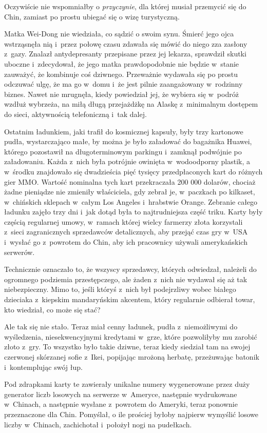 \documentclass[oneside,polish,11pt,rmheadings]{mwbk}
\begin{document}
Oczywiście nie wspomniałby o \textit{przyczynie}, dla której musiał przemycić się do Chin, zamiast po prostu ubiegać się o wizę turystyczną.

Matka Wei-Dong nie wiedziała, co sądzić o swoim synu. Śmierć jego ojca wstrząsnęła nią i~przez połowę czasu zdawała się mówić do niego zza zasłony z~gazy. Znalazł antydepresanty przepisane przez jej lekarza, sprawdził skutki uboczne i~zdecydował, że jego matka prawdopodobnie nie będzie w~stanie zauważyć, że kombinuje coś dziwnego. Przeważnie wydawała się po prostu odczuwać ulgę, że ma go w~domu i~że jest pilnie zaangażowany w~rodzinny biznes. Nawet nie mrugnęła, kiedy powiedział jej, że wybiera się w~podróż wzdłuż wybrzeża, na miłą długą przejażdżkę na Alaskę z~minimalnym dostępem do sieci, aktywnością telefoniczną i~tak dalej.

Ostatnim ładunkiem, jaki trafił do kosmicznej kapsuły, były trzy kartonowe pudła, wystarczająco małe, by można je było załadować do bagażnika Huawei, którego pozostawił na długoterminowym parkingu i~zamknął podwójnie po załadowaniu. Każda z~nich była potrójnie owinięta w~wodoodporny plastik, a w~środku znajdowało się dwadzieścia pięć tysięcy przedpłaconych kart do różnych gier MMO. Wartość nominalna tych kart przekraczała 200 000 dolarów, chociaż żadne pieniądze nie zmieniły właściciela, gdy zebrał je, w~paczkach po kilkaset, w~chińskich sklepach w~całym Los Angeles i~hrabstwie Orange. Zebranie całego ładunku zajęło trzy dni i~jak dotąd była to najtrudniejsza część triku. Karty były częścią regularnej umowy, w~ramach której wielcy farmerzy złota korzystali z~sieci zagranicznych sprzedawców detalicznych, aby przejąć czas gry w~USA i~wysłać go z~powrotem do Chin, aby ich pracownicy używali amerykańskich serwerów.

Technicznie oznaczało to, że wszyscy sprzedawcy, których odwiedzał, należeli do ogromnego podziemia przestępczego, ale żaden z~nich nie wydawał się aż tak niebezpieczny. Mimo to, jeśli któryś z~nich był podejrzliwy wobec białego dzieciaka z~kiepskim mandaryńskim akcentem, który regularnie odbierał towar, kto wiedział, co może się stać?

Ale tak się nie stało. Teraz miał cenny ładunek, pudła z~niemożliwymi do wyśledzenia, niesekwencyjnymi kredytami w~grze, które pozwoliłyby mu zarobić złoto z~gry. To wszystko było takie dziwne, teraz kiedy siedział tam na swojej czerwonej skórzanej sofie z~Ikei, popijając mrożoną herbatę, przeżuwając batonik i~kontemplując swój łup.

Pod zdrapkami karty te zawierały unikalne numery wygenerowane przez duży generator liczb losowych na serwerze w~Ameryce, następnie wydrukowane w~Chinach, a następnie wysłane z~powrotem do Ameryki, teraz ponownie przeznaczone dla Chin. Pomyślał, o ile prościej byłoby najpierw wymyślić losowe liczby w~Chinach, zachichotał i~położył nogi na pudełkach.
\end{document}
